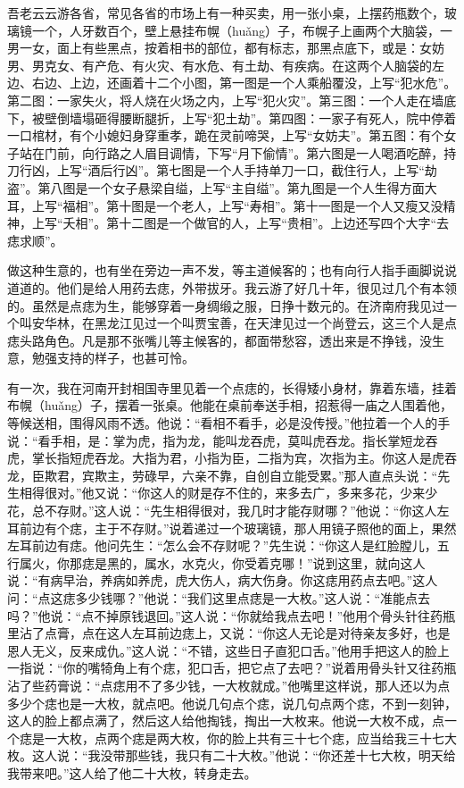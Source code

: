\documentclass[12pt,UTF8]{ctexbook}
\begin{document}
吾老云云游各省，常见各省的市场上有一种买卖，用一张小桌，上摆药瓶数个，玻璃镜一个，人牙数百个，壁上悬挂布幌（huǎng）子，布幌子上画两个大脑袋，一男一女，面上有些黑点，按着相书的部位，都有标志，那黑点底下，或是：女妨男、男克女、有产危、有火灾、有水危、有土劫、有疾病。在这两个人脑袋的左边、右边、上边，还画着十二个小图，第一图是一个人乘船覆没，上写“犯水危”。第二图：一家失火，将人烧在火场之内，上写“犯火灾”。第三图：一个人走在墙底下，被壁倒墙塌砸得腰断腿折，上写“犯土劫”。第四图：一家子有死人，院中停着一口棺材，有个小媳妇身穿重孝，跪在灵前啼哭，上写“女妨夫”。第五图：有个女子站在门前，向行路之人眉目调情，下写“月下偷情”。第六图是一人喝酒吃醉，持刀行凶，上写“酒后行凶”。第七图是一个人手持单刀一口，截住行人，上写“劫盗”。第八图是一个女子悬梁自缢，上写“主自缢”。第九图是一个人生得方面大耳，上写“福相”。第十图是一个老人，上写“寿相”。第十一图是一个人又瘦又没精神，上写“夭相”。第十二图是一个做官的人，上写“贵相”。上边还写四个大字“去痣求顺”。

做这种生意的，也有坐在旁边一声不发，等主道候客的；也有向行人指手画脚说说道道的。他们是给人用药去痣，外带拔牙。我云游了好几十年，很见过几个有本领的。虽然是点痣为生，能够穿着一身绸缎之服，日挣十数元的。在济南府我见过一个叫安华林，在黑龙江见过一个叫贾宝善，在天津见过一个尚登云，这三个人是点痣头路角色。凡是那不张嘴儿等主候客的，都面带愁容，透出来是不挣钱，没生意，勉强支持的样子，也甚可怜。

有一次，我在河南开封相国寺里见着一个点痣的，长得矮小身材，靠着东墙，挂着布幌（huǎng）子，摆着一张桌。他能在桌前奉送手相，招惹得一庙之人围着他，等候送相，围得风雨不透。他说：“看相不看手，必是没传授。”他拉着一个人的手说：“看手相，是：掌为虎，指为龙，能叫龙吞虎，莫叫虎吞龙。指长掌短龙吞虎，掌长指短虎吞龙。大指为君，小指为臣，二指为宾，次指为主。你这人是虎吞龙，臣欺君，宾欺主，劳碌早，六亲不靠，自创自立能受累。”那人直点头说：“先生相得很对。”他又说：“你这人的财是存不住的，来多去广，多来多花，少来少花，总不存财。”这人说：“先生相得很对，我几时才能存财哪？”他说：“你这人左耳前边有个痣，主于不存财。”说着递过一个玻璃镜，那人用镜子照他的面上，果然左耳前边有痣。他问先生：“怎么会不存财呢？”先生说：“你这人是红脸膛儿，五行属火，你那痣是黑的，属水，水克火，你受着克哪！”说到这里，就向这人说：“有病早治，养病如养虎，虎大伤人，病大伤身。你这痣用药点去吧。”这人问：“点这痣多少钱哪？”他说：“我们这里点痣是一大枚。”这人说：“准能点去吗？”他说：“点不掉原钱退回。”这人说：“你就给我点去吧！”他用个骨头针往药瓶里沾了点膏，点在这人左耳前边痣上，又说：“你这人无论是对待亲友多好，也是恩人无义，反来成仇。”这人说：“不错，这些日子直犯口舌。”他用手把这人的脸上一指说：“你的嘴犄角上有个痣，犯口舌，把它点了去吧？”说着用骨头针又往药瓶沾了些药膏说：“点痣用不了多少钱，一大枚就成。”他嘴里这样说，那人还以为点多少个痣也是一大枚，就点吧。他说几句点个痣，说几句点两个痣，不到一刻钟，这人的脸上都点满了，然后这人给他掏钱，掏出一大枚来。他说一大枚不成，点一个痣是一大枚，点两个痣是两大枚，你的脸上共有三十七个痣，应当给我三十七大枚。这人说：“我没带那些钱，我只有二十大枚。”他说：“你还差十七大枚，明天给我带来吧。”这人给了他二十大枚，转身走去。
\end{document}
